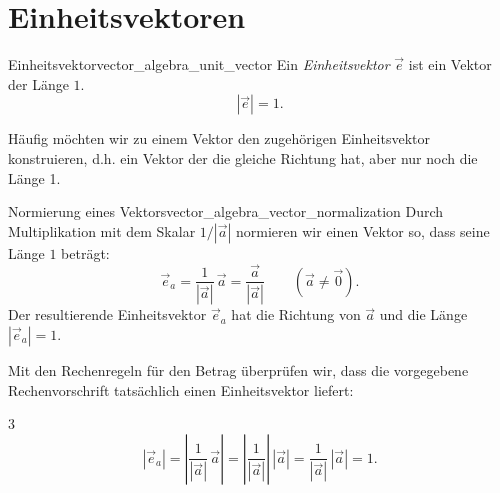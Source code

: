 \section{Einheitsvektoren}
\label{sec:vector_algebra_unit_vectors}

\begin{DefinitionBox}{Einheitsvektor}{vector_algebra_unit_vector}
  Ein \emph{Einheitsvektor} $\vec e$  ist ein Vektor der Länge $1$. 
  \[
    |\vec e|=1.
  \]
\end{DefinitionBox}

Häufig möchten wir zu einem Vektor den zugehörigen Einheitsvektor konstruieren, d.h.
ein Vektor der die gleiche Richtung hat, aber nur noch die Länge 1.
\begin{TheoremBox}{Normierung eines Vektors}{vector_algebra_vector_normalization}
  Durch Multiplikation mit dem Skalar $1/|\vec a|$ normieren wir einen Vektor
  so, dass seine Länge $1$ beträgt:
  \[
    \vec e_a
    =\frac1{|\vec a|}\,\vec a
    =\frac{\vec a}{|\vec a|}
    \qquad (\vec a\ne\vec 0).
  \]
  Der resultierende Einheitsvektor $\vec e_a$ hat die Richtung von $\vec a$
  und die Länge $|\vec e_a|=1$.
\end{TheoremBox}

Mit den Rechenregeln für den Betrag überprüfen wir, dass die
vorgegebene Rechenvorschrift tatsächlich einen Einheitsvektor liefert:
\begin{ClozeArea}[26]{3}
  \[
    |\vec e_a|
    =\left|\frac1{|\vec a|}\,\vec a\right|
    =\left|\frac1{|\vec a|}\right|\,|\vec a|
    =\frac1{|\vec a|}\,|\vec a|
    =1.
  \]
\end{ClozeArea}

